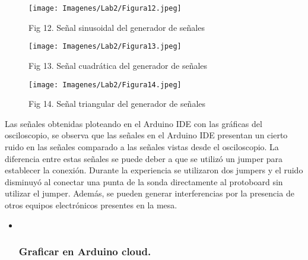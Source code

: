 \documentclass[
  letterpaper,
  DIV=11,
  numbers=noendperiod]{scrartcl}
\begin{document}
\begin{figure}[H]

{\centering \texttt{[image: Imagenes/Lab2/Figura12.jpeg]}

}

\caption{Fig 12. Señal sinusoidal del generador de señales}

\end{figure}%
\begin{figure}[H]

{\centering \texttt{[image: Imagenes/Lab2/Figura13.jpeg]}

}

\caption{Fig 13. Señal cuadrática del generador de señales}

\end{figure}%
\begin{figure}[H]

{\centering \texttt{[image: Imagenes/Lab2/Figura14.jpeg]}

}

\caption{Fig 14. Señal triangular del generador de señales}

\end{figure}%

Las señales obtenidas ploteando en el Arduino IDE con las gráficas del
osciloscopio, se observa que las señales en el Arduino IDE presentan un
cierto ruido en las señales comparado a las señales vistas desde el
osciloscopio. La diferencia entre estas señales se puede deber a que se
utilizó un jumper para establecer la conexión. Durante la experiencia se
utilizaron dos jumpers y el ruido disminuyó al conectar una punta de la
sonda directamente al protoboard sin utilizar el jumper. Además, se
pueden generar interferencias por la presencia de otros equipos
electrónicos presentes en la mesa.

\begin{itemize}
\item ~
  \subsubsection{Graficar en Arduino
  cloud.}\label{graficar-en-arduino-cloud.}
\end{itemize}
\end{document}
